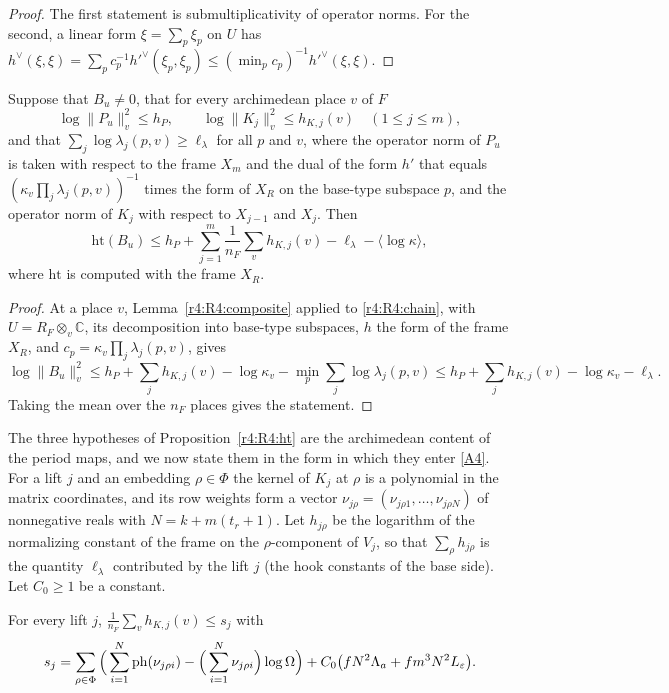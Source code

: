 \begin{proof}
The first statement is submultiplicativity of operator norms. For the second, a linear form $\xi=\sum_p\xi_p$ on $U$ has $h^\vee(\xi,\xi)=\sum_pc_p^{-1}h'^\vee(\xi_p,\xi_p)\le(\min_pc_p)^{-1}h'^\vee(\xi,\xi)$.
\end{proof}

\begin{proposition}\label{r4:R4:ht}
Suppose that $B_u\ne0$, that for every archimedean place $v$ of $F$
\[
\log\lVert P_u\rVert_v^2\le h_P,\qquad \log\lVert K_j\rVert_v^2\le h_{K,j}(v)\quad(1\le j\le m),
\]
and that $\sum_j\log\lambda_j(p,v)\ge\ell_\lambda$ for all $p$ and $v$, where the operator norm of $P_u$ is taken with respect to the frame $X_m$ and the dual of the form $h'$ that equals $(\kappa_v\prod_j\lambda_j(p,v))^{-1}$ times the form of $X_R$ on the base-type subspace $p$, and the operator norm of $K_j$ with respect to $X_{j-1}$ and $X_j$. Then
\[
\mathrm{ht}(B_u)\le h_P+\sum_{j=1}^m\frac1{n_F}\sum_vh_{K,j}(v)-\ell_\lambda-\langle\log\kappa\rangle,
\]
where $\mathrm{ht}$ is computed with the frame $X_R$.
\end{proposition}

\begin{proof}
At a place $v$, Lemma~\ref{r4:R4:composite} applied to \eqref{r4:R4:chain}, with $U=R_F\otimes_v\mathbb C$, its decomposition into base-type subspaces, $h$ the form of the frame $X_R$, and $c_p=\kappa_v\prod_j\lambda_j(p,v)$, gives
\[
\log\lVert B_u\rVert_v^2\le h_P+\sum_jh_{K,j}(v)-\log\kappa_v-\min_p\sum_j\log\lambda_j(p,v)\le h_P+\sum_jh_{K,j}(v)-\log\kappa_v-\ell_\lambda .
\]
Taking the mean over the $n_F$ places gives the statement.
\end{proof}

The three hypotheses of Proposition~\ref{r4:R4:ht} are the archimedean content of the period maps, and we now state them in the form in which they enter \eqref{A4}. For a lift $j$ and an embedding $\rho\in\Phi$ the kernel of $K_j$ at $\rho$ is a polynomial in the matrix coordinates, and its row weights form a vector $\nu_{j\rho}=(\nu_{j\rho1},\dots,\nu_{j\rho N})$ of nonnegative reals with $N=k+m(t_r+1)$. Let $h_{j\rho}$ be the logarithm of the normalizing constant of the frame on the $\rho$-component of $V_j$, so that $\sum_\rho h_{j\rho}$ is the quantity $\ell_\lambda$ contributed by the lift $j$ (the hook constants of the base side). Let $C_0\ge1$ be a constant.

\begin{hypothesis}\label{r4:R4:HK}
For every lift $j$, $\frac1{n_F}\sum_vh_{K,j}(v)\le s_j$ with
\[
s_j=\sum_{\rho\in\Phi}\Big(\sum_{i=1}^N\operatorname{ph}(\nu_{j\rho i})-\Big(\sum_{i=1}^N\nu_{j\rho i}\Big)\log\Omega\Big)+C_0\big(fN^2\Lambda_a+fm^3N^2L_\varepsilon\big).
\]
\end{hypothesis}

